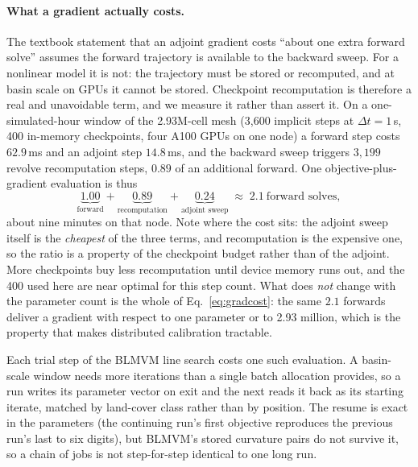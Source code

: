 \documentclass[11pt]{article}
\begin{document}
\paragraph{What a gradient actually costs.}
The textbook statement that an adjoint gradient costs ``about one
extra forward solve'' assumes the forward trajectory is available to
the backward sweep. For a nonlinear model it is not: the trajectory
must be stored or recomputed, and at basin scale on GPUs it cannot be
stored. Checkpoint recomputation is therefore a real and unavoidable
term, and we measure it rather than assert it. On a one-simulated-hour
window of the 2.93M-cell mesh (3{,}600 implicit steps at
$\Delta t = 1$\,s, 400 in-memory checkpoints, four A100 GPUs on one
node) a
forward step costs $62.9$\,ms and an adjoint step $14.8$\,ms, and the
backward sweep triggers $3{,}199$ revolve recomputation steps, $0.89$
of an additional forward. One objective-plus-gradient
evaluation is thus
\begin{equation}
  \underbrace{1.00}_{\text{forward}}
  + \underbrace{0.89}_{\text{recomputation}}
  + \underbrace{0.24}_{\text{adjoint sweep}}
  \;\approx\; 2.1 \ \text{forward solves},
\label{eq:gradcost}
\end{equation}
about nine minutes on that node. Note where the cost sits: the
adjoint sweep itself is the \emph{cheapest} of the three terms, and
recomputation is the expensive one, so the ratio is a property of the
checkpoint budget rather than of the adjoint. More checkpoints buy
less recomputation until device memory runs out, and the 400 used here
are near optimal for this step count. What does \emph{not} change with
the parameter count is the whole of Eq.~\eqref{eq:gradcost}: the same
$2.1$ forwards deliver a gradient with respect to one parameter or to
2.93 million, which is the property that makes distributed calibration
tractable.

Each trial step
of the BLMVM line search costs one such evaluation. A basin-scale
window needs more iterations than a single batch allocation provides,
so a run writes its parameter vector on exit and the next reads it back
as its starting iterate, matched by land-cover class rather than by
position. The resume is exact in the parameters (the continuing run's
first objective reproduces the previous run's last to six digits), but
BLMVM's stored curvature pairs do not survive it, so a chain of jobs
is not step-for-step identical to one long run.
\end{document}
